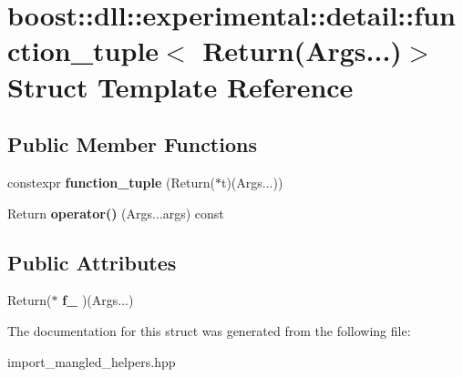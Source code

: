 \hypertarget{a01472}{}\section{boost\+:\+:dll\+:\+:experimental\+:\+:detail\+:\+:function\+\_\+tuple$<$ Return(Args...)$>$ Struct Template Reference}
\label{a01472}
\subsection*{Public Member Functions}
\begin{DoxyCompactItemize}
\item 
\mbox{\label{a01472_ab85660385eab5c21aaa4e70317680ce5}} 
constexpr {\bfseries function\+\_\+tuple} (Return($\ast$t)(Args...))
\item 
\mbox{\label{a01472_a51f92c9e9f4909c86f179070f026c7f3}} 
Return {\bfseries operator()} (Args...\+args) const
\end{DoxyCompactItemize}
\subsection*{Public Attributes}
\begin{DoxyCompactItemize}
\item 
\mbox{\label{a01472_a16864d5b5d7f82eba86c331ecc3fc5d0}} 
Return($\ast$ {\bfseries f\+\_\+} )(Args...)
\end{DoxyCompactItemize}


The documentation for this struct was generated from the following file\+:\begin{DoxyCompactItemize}
\item 
import\+\_\+mangled\+\_\+helpers.\+hpp\end{DoxyCompactItemize}

